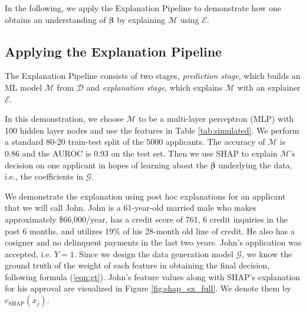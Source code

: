 \documentclass[mnsc,blindrev]{informs3}
\begin{document}
   In the following, we apply the Explanation Pipeline to demonstrate how one obtains an understanding of $\boldsymbol{\beta}$ by explaining $\mathcal{M}$ using $\mathcal{E}$. %


\subsection{Applying the Explanation Pipeline}
\label{sec:applying_to_simulated}
The Explanation Pipeline consists of two stages, \emph{prediction stage}, which builds an ML model $\mathcal{M}$ from $\mathcal{D}$ and \emph{explanation stage}, which explains $\mathcal{M}$ with an explainer $\mathcal{E}$.

In this demonstration, we choose $\mathcal{M}$ to be a multi-layer perceptron (MLP) with 100 hidden layer nodes and use the features in Table \ref{tab:simulated}. We perform a standard 80-20 train-test split of the 5000 applicants. The accuracy of $\mathcal{M}$ is 0.86 and the AUROC is 0.93 on the test set. %
Then we use SHAP to explain $\mathcal{M}$'s decision on one applicant in hopes of learning about the $\boldsymbol{\beta}$ underlying the data, i.e., the coefficients in $\mathcal{G}$.%

We demonstrate the explanation using post hoc explanations for an applicant that we will call John. John is a 61-year-old married male who makes approximately \$66,000/year, has a credit score of 761, 6 credit inquiries in the past 6 months, and utilizes 19\% of his 28-month old line of credit. He also has a cosigner and no delinquent payments in the last two years. John's application was accepted, i.e. $Y = 1$. Since we design the data generation model $\mathcal{G}$, we know the ground truth of the weight of each feature in obtaining the final decision, following formula (\ref{eqn:gt}). John's feature values along with SHAP's explanation for his approval are visualized in Figure \ref{fig:shap_ex_full}. We denote them by $e_\text{SHAP}(x_j)$. %
\end{document}
